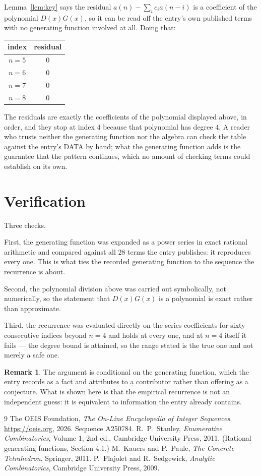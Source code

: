 \documentclass[11pt,a4paper]{article}
\theoremstyle{plain}
\theoremstyle{definition}
\newtheorem{remark}[theorem]{Remark}
\begin{document}
Lemma~\ref{lem:key} says the residual $a(n)-\sum_ic_ia(n-i)$ is a coefficient of the
polynomial $D(x)G(x)$, so it can be read off the entry's own published terms with no
generating function involved at all. Doing that:
\begin{center}
\begin{tabular}{cc}
index & residual \\ \hline
$n=5$ & $0$ \\
$n=6$ & $0$ \\
$n=7$ & $0$ \\
$n=8$ & $0$
\end{tabular}
\end{center}
The residuals are exactly the coefficients of the polynomial displayed above, in order, and
they stop at index $4$ because that polynomial has degree $4$. A reader who trusts
neither the generating function nor the algebra can check the table against the entry's DATA
by hand; what the generating function adds is the guarantee that the pattern continues, which
no amount of checking terms could establish on its own.

\section{Verification}

Three checks.

First, the generating function was expanded as a power series in exact rational arithmetic and
compared against all $28$ terms the entry publishes: it reproduces every one. This is
what ties the recorded generating function to the sequence the recurrence is about.

Second, the polynomial division above was carried out symbolically, not numerically, so the
statement that $D(x)G(x)$ is a polynomial is exact rather than approximate.

Third, the recurrence was evaluated directly on the series coefficients for sixty consecutive
indices beyond $n=4$ and holds at every one, and at $n=4$ itself it fails --- the
degree bound is attained, so the range stated is the true one and not merely a safe one.

\begin{remark}
The argument is conditional on the generating function, which the entry records as a fact and
attributes to a contributor rather than offering as a conjecture. What is shown here is that
the empirical recurrence is not an independent guess: it is equivalent to information the
entry already contains.
\end{remark}

\begin{thebibliography}{9}
 The OEIS Foundation, \emph{The On-Line Encyclopedia of Integer
Sequences}, \url{https://oeis.org}, 2026. Sequence A250784.
 R.~P.~Stanley, \emph{Enumerative Combinatorics}, Volume 1, 2nd ed.,
Cambridge University Press, 2011. (Rational generating functions, Section 4.1.)
 M.~Kauers and P.~Paule, \emph{The Concrete Tetrahedron}, Springer, 2011.
 P.~Flajolet and R.~Sedgewick, \emph{Analytic Combinatorics}, Cambridge
University Press, 2009.
\end{thebibliography}
\end{document}
